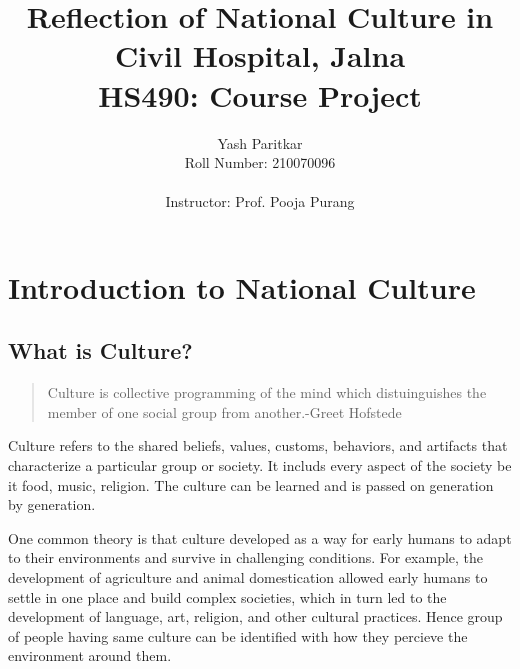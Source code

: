 \documentclass{article}
\title{\textbf{Reflection of National Culture in Civil Hospital, Jalna}\\
HS490: Course Project}
\author{Yash Paritkar\\
Roll Number: 210070096\\ 
\\
Instructor: Prof. Pooja Purang}
\begin{document}
\maketitle

\newpage
\tableofcontents

\newpage
\listoffigures
\newpage
\listoftables

\newpage
\section{Introduction to National Culture}
\subsection{What is Culture?}
\begin{quote}
    Culture is collective programming of the mind which distuinguishes the member of one social group from another.\hfill -Greet Hofstede
\end{quote}

Culture refers to the shared beliefs, values, customs, behaviors, and artifacts that characterize a particular group or society. It includs every aspect of the society be it food, music, religion. The culture can be learned and is passed on generation by generation. 

One common theory is that culture developed as a way for early humans to adapt to their environments and survive in challenging conditions. For example, the development of agriculture and animal domestication allowed early humans to settle in one place and build complex societies, which in turn led to the development of language, art, religion, and other cultural practices. Hence group of people having same culture can be identified with how they percieve the environment around them.
 
\end{document}
